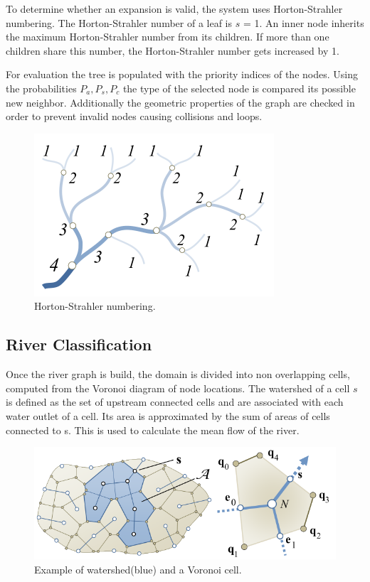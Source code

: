 To determine whether an expansion is valid, the system uses Horton-Strahler numbering. The Horton-Strahler number of a leaf  is $s$ = 1. An inner node inherits the maximum Horton-Strahler number from its children. If more than one children share this number, the Horton-Strahler number gets increased by 1.

For evaluation the tree is populated with the priority indices of the nodes. Using the probabilities  $P_a, P_s, P_c$ the type of the selected node is compared its possible new neighbor. Additionally the geometric properties of the graph are checked in order to prevent invalid nodes causing collisions and loops.  
\begin{figure}[htb]
	\centering
	\includegraphics[width=0.5\linewidth]{GGG13/horton-strahler}
	\caption{Horton-Strahler numbering.}
	\label{fig:horton_strahler}
\end{figure}

\subsection{River Classification}
Once the river graph is build, the domain is divided into non overlapping cells, computed from the Voronoi diagram of node locations.  
The watershed of a cell $s$ is defined as the set of upstream connected cells and are associated with each water outlet of a cell. Its area is approximated by the sum of areas of cells connected to s. This is used to calculate the mean flow of the river. 

\begin{figure}[htb]
	\centering
	\includegraphics[width=\linewidth]{GGG13/voronoi_watershed}
	\caption{Example of watershed(blue) and a Voronoi cell.}
	\label{fig:voronoi_watershed}
\end{figure}

